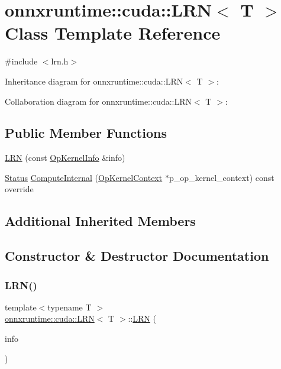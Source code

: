 \hypertarget{classonnxruntime_1_1cuda_1_1LRN}{}\section{onnxruntime\+:\+:cuda\+:\+:L\+RN$<$ T $>$ Class Template Reference}
\label{classonnxruntime_1_1cuda_1_1LRN}


{\ttfamily \#include $<$lrn.\+h$>$}



Inheritance diagram for onnxruntime\+:\+:cuda\+:\+:L\+RN$<$ T $>$\+:


Collaboration diagram for onnxruntime\+:\+:cuda\+:\+:L\+RN$<$ T $>$\+:
\subsection*{Public Member Functions}
\begin{DoxyCompactItemize}
\item 
\mbox{\hyperlink{classonnxruntime_1_1cuda_1_1LRN_aa8f3996ce012424a2f6d65e15e5cf457}{L\+RN}} (const \mbox{\hyperlink{classonnxruntime_1_1OpKernelInfo}{Op\+Kernel\+Info}} \&info)
\item 
\mbox{\hyperlink{classonnxruntime_1_1common_1_1Status}{Status}} \mbox{\hyperlink{classonnxruntime_1_1cuda_1_1LRN_a89f6b059658b713b1e3f7a05ddf19712}{Compute\+Internal}} (\mbox{\hyperlink{classonnxruntime_1_1OpKernelContext}{Op\+Kernel\+Context}} $\ast$p\+\_\+op\+\_\+kernel\+\_\+context) const override
\end{DoxyCompactItemize}
\subsection*{Additional Inherited Members}


\subsection{Constructor \& Destructor Documentation}
\mbox{\label{classonnxruntime_1_1cuda_1_1LRN_aa8f3996ce012424a2f6d65e15e5cf457}} 
\subsubsection{\texorpdfstring{L\+R\+N()}{LRN()}}
{\footnotesize\ttfamily template$<$typename T $>$ \\
\mbox{\hyperlink{classonnxruntime_1_1cuda_1_1LRN}{onnxruntime\+::cuda\+::\+L\+RN}}$<$ T $>$\+::\mbox{\hyperlink{classonnxruntime_1_1cuda_1_1LRN}{L\+RN}} (\begin{DoxyParamCaption}\item[{const \mbox{\hyperlink{classonnxruntime_1_1OpKernelInfo}{Op\+Kernel\+Info}} \&}]{info }\end{DoxyParamCaption})}



